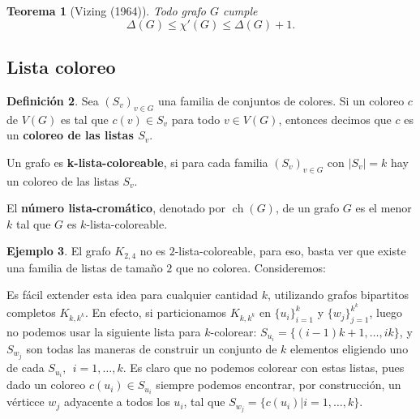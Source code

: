 \documentclass[12pt]{report}
\theoremstyle{plain}
\newtheorem{theorem}{Teorema}[section]
\theoremstyle{definition}
\newtheorem{definition}[theorem]{Definición}
\newtheorem{example}[theorem]{Ejemplo}
\newcommand{\abs}[1]{\left \vert #1 \right \vert}
\newcommand{\ch}[1]{\operatorname{ch} (#1)}
\begin{document}
\begin{theorem}[Vizing (1964)]
Todo grafo $G$ cumple
\[
    \boxed{\Delta (G) \leq \chi ' (G) \leq \Delta (G) +1 .}
\]
\end{theorem}









\subsection{Lista coloreo}

\begin{definition}
Sea $(S_v)_{v \in G}$ una familia de conjuntos de colores. Si un coloreo $c$ de $V(G)$ es tal que $c(v) \in S_v$ para todo $v \in V(G)$, entonces decimos que $c$ es un \textbf{coloreo de las listas $S_v$}.

Un grafo es \textbf{k-lista-coloreable}, si para cada familia $(S_v)_{v \in G}$ con $\abs {S_v} = k$ hay un coloreo de las listas $S_v$.

El \textbf{número lista-cromático}, denotado por $\ch G$, de un grafo $G$ es el menor $k$ tal que $G$ es $k$-lista-coloreable.
\end{definition}

\begin{example}\label{ejemplo:ejemplo de grafos bipartitos que no son k-lista coloreables}
El grafo $K_{2,4}$ no es $2$-lista-coloreable, para eso, basta ver que existe una familia de listas de tamaño $2$ que no colorea. Consideremos:


Es fácil extender esta idea para cualquier cantidad $k$, utilizando grafos bipartitos completos $K_{k, k^k}$. En efecto, si particionamos $K_{k,k^k}$ en $\{u_i\}_{i = 1}^k$ y $\{w_j\}_{j = 1}^{k^k}$, luego no podemos usar la siguiente lista para $k$-colorear: $S_{u_i} = \{(i-1)k + 1, \ldots, ik\}$, y $S_{w_j}$ son todas las maneras de construir un conjunto de $k$ elementos eligiendo uno de cada $S_{u_i}, \: \: i = 1 , \ldots, k$. Es claro que no podemos colorear con estas listas, pues dado un coloreo $c(u_i) \in S_{u_i}$ siempre podemos encontrar, por construcción, un vérticce $w_j$ adyacente a todos los $u_i$, tal que $S_{w_j} = \{ c(u_i) | i = 1, \ldots, k\}$.
\end{example}
\end{document}
